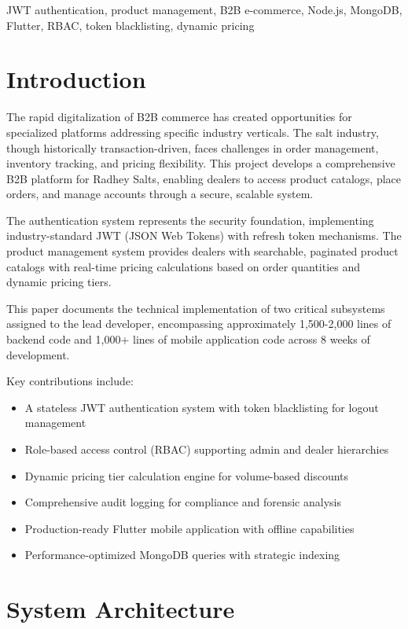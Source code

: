 \documentclass[conference]{IEEEtran}
\begin{document}
\begin{IEEEkeywords}
JWT authentication, product management, B2B e-commerce, Node.js, MongoDB, Flutter, RBAC, token blacklisting, dynamic pricing
\end{IEEEkeywords}

\section{Introduction}

The rapid digitalization of B2B commerce has created opportunities for specialized platforms addressing specific industry verticals. The salt industry, though historically transaction-driven, faces challenges in order management, inventory tracking, and pricing flexibility. This project develops a comprehensive B2B platform for Radhey Salts, enabling dealers to access product catalogs, place orders, and manage accounts through a secure, scalable system.

The authentication system represents the security foundation, implementing industry-standard JWT (JSON Web Tokens) with refresh token mechanisms. The product management system provides dealers with searchable, paginated product catalogs with real-time pricing calculations based on order quantities and dynamic pricing tiers.

This paper documents the technical implementation of two critical subsystems assigned to the lead developer, encompassing approximately 1,500-2,000 lines of backend code and 1,000+ lines of mobile application code across 8 weeks of development.

Key contributions include:
\begin{itemize}
\item A stateless JWT authentication system with token blacklisting for logout management
\item Role-based access control (RBAC) supporting admin and dealer hierarchies
\item Dynamic pricing tier calculation engine for volume-based discounts
\item Comprehensive audit logging for compliance and forensic analysis
\item Production-ready Flutter mobile application with offline capabilities
\item Performance-optimized MongoDB queries with strategic indexing
\end{itemize}

\section{System Architecture}
\end{document}

